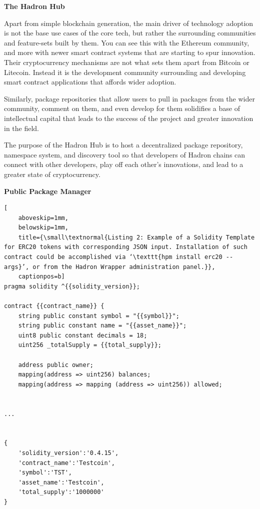 \documentclass{%
	article}
\begin{document}
\begin{center}
\textbf{The Hadron Hub}
\end{center}

Apart from simple blockchain generation, the main driver of technology adoption is not the base use cases of the core tech, but rather the surrounding communities and feature-sets built by them. You can see this with the Ethereum community, and more with newer smart contract systems that are starting to spur innovation. Their cryptocurrency mechanisms are not what sets them apart from Bitcoin or Litecoin. Instead it is the development community surrounding and developing smart contract applications that affords wider adoption.

Similarly, package repositories that allow users to pull in packages from the wider community, comment on them, and even develop for them solidifies a base of intellectual capital that leads to the success of the project and greater innovation in the field.

The purpose of the Hadron Hub is to host a decentralized package repository, namespace system, and discovery tool so that developers of Hadron chains can connect with other developers, play off each other's innovations, and lead to a greater state of cryptocurrency.

\begin{center}
\textbf{Public Package Manager}
\end{center}

\begin{lstlisting}[
	aboveskip=1mm,
	belowskip=1mm,
	title={\small\textnormal{Listing 2: Example of a Solidity Template for ERC20 tokens with corresponding JSON input. Installation of such contract could be accomplished via ‘\texttt{hpm install erc20 --args}’, or from the Hadron Wrapper administration panel.}},
	captionpos=b]
pragma solidity ^{{solidity_version}};

contract {{contract_name}} {
    string public constant symbol = "{{symbol}}";
    string public constant name = "{{asset_name}}";
    uint8 public constant decimals = 18;
    uint256 _totalSupply = {{total_supply}};

    address public owner;
    mapping(address => uint256) balances;
    mapping(address => mapping (address => uint256)) allowed;
   
    
...


{
    'solidity_version':'0.4.15',
    'contract_name':'Testcoin',
    'symbol':'TST',
    'asset_name':'Testcoin',
    'total_supply':'1000000'
}
\end{lstlisting}
\end{document}
